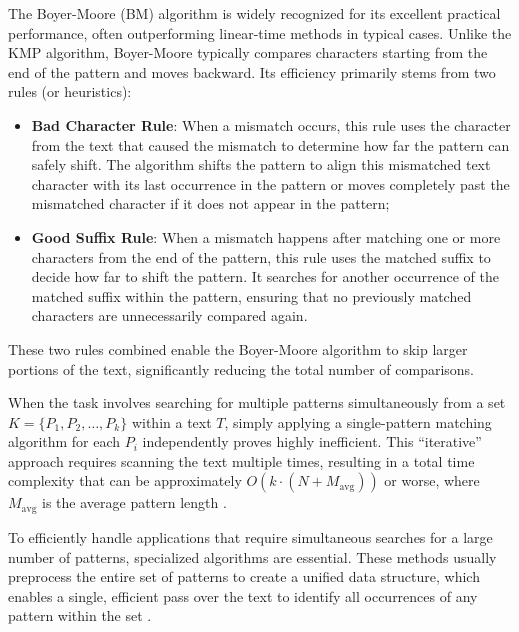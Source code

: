 \vspace{1em}


The Boyer-Moore (BM) algorithm \cite{BoyerMoore1977} is widely recognized for its excellent practical performance, often outperforming linear-time methods in typical cases. Unlike the KMP algorithm, Boyer-Moore typically compares characters starting from the end of the pattern and moves backward.
Its efficiency primarily stems from two rules (or heuristics):
\begin{itemize}
    \item \textbf{Bad Character Rule}: When a mismatch occurs, this rule uses the character from the text that caused the mismatch to determine how far the pattern can safely shift. The algorithm shifts the pattern to align this mismatched text character with its last occurrence in the pattern or moves completely past the mismatched character if it does not appear in the pattern;
    \item \textbf{Good Suffix Rule}: When a mismatch happens after matching one or more characters from the end of the pattern, this rule uses the matched suffix to decide how far to shift the pattern. It searches for another occurrence of the matched suffix within the pattern, ensuring that no previously matched characters are unnecessarily compared again.
\end{itemize}
These two rules combined enable the Boyer-Moore algorithm to skip larger portions of the text, significantly reducing the total number of comparisons.


When the task involves searching for multiple patterns simultaneously from a set $K = \{P_1, P_2, \dots, P_k\}$ within a text $T$, simply applying a single-pattern matching algorithm for each $P_i$ independently proves highly inefficient. This ``iterative'' approach requires scanning the text multiple times, resulting in a total time complexity that can be approximately $O(k \cdot (N+M_{\text{avg}}))$ or worse, where $M_{\text{avg}}$ is the average pattern length \cite{AhoCorasick1975}.

To efficiently handle applications that require simultaneous searches for a large number of patterns, specialized algorithms are essential. These methods usually preprocess the entire set of patterns to create a unified data structure, which enables a single, efficient pass over the text to identify all occurrences of any pattern within the set \cite{Gusfield1997}.

